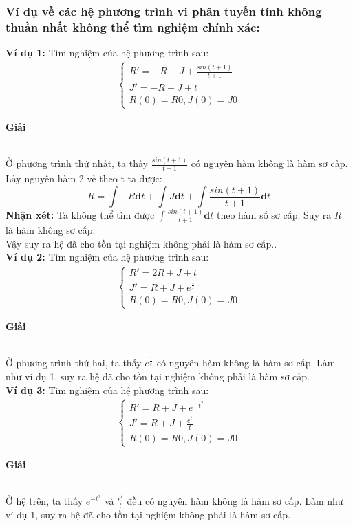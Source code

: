 \subsubsection*{Ví dụ về các hệ phương trình vi phân tuyến tính không thuần nhất không thể tìm nghiệm chính xác:}

\textbf{Ví dụ 1:} Tìm nghiệm của hệ phương trình sau:
\begin{align*}
    \begin{cases}
        R'=-R+J+\frac{sin(t+1)}{t+1}\\
        J'=-R+J+t \\
        R(0)=R0, J(0)=J0
    \end{cases}
\end{align*}
\centerline{\textbf{Giải}}\\
Ở phương trình thứ nhất, ta thấy $\frac{sin(t+1)}{t+1}$ có nguyên hàm không là hàm sơ cấp. Lấy nguyên hàm 2 vế theo t ta được:
$$R=\displaystyle\int\limits-R\mathbf{d}t+\displaystyle\int\limits J\mathbf{d}t+\displaystyle\int\limits \frac{sin(t+1)}{t+1}\mathbf{d}t$$
\textbf{Nhận xét:} Ta không thể tìm được $\displaystyle\int\limits\frac{sin(t+1)}{t+1}\mathbf{d}t$ theo hàm số sơ cấp. Suy ra $R$ là hàm không sơ cấp.\\
Vậy suy ra hệ đã cho tồn tại nghiệm không phải là hàm sơ cấp..\\

\textbf{Ví dụ 2:} Tìm nghiệm của hệ phương trình sau:
\begin{align*}
    \begin{cases}
        R'=2R+J+t\\
        J'=R+J+e^{\frac{1}{t}} \\
        R(0)=R0, J(0)=J0
    \end{cases}
\end{align*}
\centerline{\textbf{Giải}}\\
Ở phương trình thứ hai, ta thấy $e^{\frac{1}{t}}$ có nguyên hàm không là hàm sơ cấp. Làm như ví dụ 1, suy ra hệ đã cho tồn tại nghiệm không phải là hàm sơ cấp.\\

\textbf{Ví dụ 3:} Tìm nghiệm của hệ phương trình sau:
\begin{align*}
    \begin{cases}
        R'=R+J+e^{-t^2}\\
        J'=R+J+\frac{e^t}{t} \\
        R(0)=R0, J(0)=J0
    \end{cases}
\end{align*}
\centerline{\textbf{Giải}}\\
Ở hệ trên, ta thấy $e^{-t^2}$ và $\frac{e^t}{t}$ đều có nguyên hàm không là hàm sơ cấp. Làm như ví dụ 1, suy ra hệ đã cho tồn tại nghiệm không phải là hàm sơ cấp.\\

